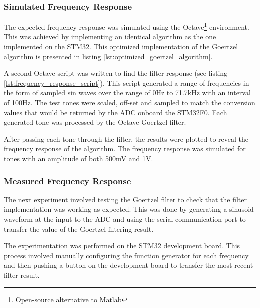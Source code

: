 \subsubsection{Simulated Frequency Response}
The expected frequency response was simulated using the Octave\footnote{Open-source alternative to Matlab} environment. This was achieved by implementing an identical algorithm as the one implemented on the STM32. This optimized implementation of the Goertzel algorithm is presented in listing \ref{lst:optimized_goertzel_algorithm}.

A second Octave script was written to find the filter response (see listing \ref{lst:frequency_response_script}). This script generated a range of frequencies in the form of sampled sin waves over the range of 0Hz to 71.7kHz with an interval of 100Hz. The test tones were scaled, off-set and sampled to match the conversion values that would be returned by the ADC onboard the STM32F0. Each generated tone was processed by the Octave Goertzel filter.

After passing each tone through the filter, the results were plotted to reveal the frequency response of the algorithm. The frequency response was simulated for tones with an amplitude of both 500mV and 1V.

\subsubsection{Measured Frequency Response}
The next experiment involved testing the Goertzel filter to check that the filter implementation was working as expected. This was done by generating a sinusoid waveform at the input to the ADC and using the serial communication port to transfer the value of the Goertzel filtering result. 

The experimentation was performed on the STM32 development board. This process involved manually configuring the function generator for each frequency and then pushing a button on the development board to transfer the most recent filter result.

